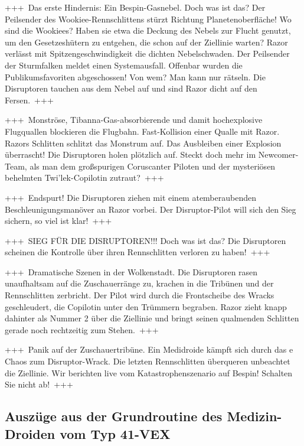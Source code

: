 +++~Das erste Hindernis: Ein Bespin-Gasnebel.
    Doch was ist das?
    Der Peilsender des Wookiee-Rennschlittens stürzt Richtung Planetenoberfläche!
    Wo sind die Wookiees?
    Haben sie etwa die Deckung des Nebels zur Flucht genutzt, um den Gesetzeshütern zu entgehen, die schon auf der Ziellinie warten?
    Razor verlässt mit Spitzengeschwindigkeit die dichten Nebelschwaden.
    Der Peilsender der Sturmfalken meldet einen Systemausfall.
    Offenbar wurden die Publikumsfavoriten abgeschossen!
    Von wem?
    Man kann nur rätseln.
    Die Disruptoren tauchen aus dem Nebel auf und sind Razor dicht auf den Fersen.~+++

+++~Monströse, Tibanna-Gas-absorbierende und damit hochexplosive Flugquallen blockieren die Flugbahn.
    Fast-Kollision einer Qualle mit Razor.
    Razors Schlitten schlitzt das Monstrum auf.
    Das Ausbleiben einer Explosion überrascht! Die Disruptoren holen plötzlich auf.
    Steckt doch mehr im Newcomer-Team, als man dem großspurigen Coruscanter Piloten und der mysteriösen behelmten Twi’lek-Copilotin zutraut?~+++

+++~Endspurt!
    Die Disruptoren ziehen mit einem atemberaubenden Beschleunigungsmanöver an Razor vorbei.
    Der Disruptor-Pilot will sich den Sieg sichern, so viel ist klar!~+++

+++~SIEG FÜR DIE DISRUPTOREN!!!
    Doch was ist das?
    Die Disruptoren scheinen die Kontrolle über ihren Rennschlitten verloren zu haben!~+++

+++~Dramatische Szenen in der Wolkenstadt.
    Die Disruptoren rasen unaufhaltsam auf die Zuschauerränge zu, krachen in die Tribünen und der Rennschlitten zerbricht.
    Der Pilot wird durch die Frontscheibe des Wracks geschleudert, die Copilotin unter den Trümmern begraben.
    Razor zieht knapp dahinter als Nummer 2 über die Ziellinie und bringt seinen qualmenden Schlitten gerade noch rechtzeitig zum Stehen.~+++

+++~Panik auf der Zuschauertribüne.
    Ein Medidroide kämpft sich durch das e Chaos zum Disruptor-Wrack.
    Die letzten Rennschlitten überqueren unbeachtet die Ziellinie.
    Wir berichten live vom Katastrophenszenario auf Bespin! Schalten Sie nicht ab!~+++

\setlength{\parskip}{0pt}
\setbeforeparaskip{0pt}
\setparaheadstyle{}
\setsubsubsecheadstyle{\centering\bfseries}

\subsection{Auszüge aus der Grundroutine des Medizin-Droiden vom Typ 41-VEX}


